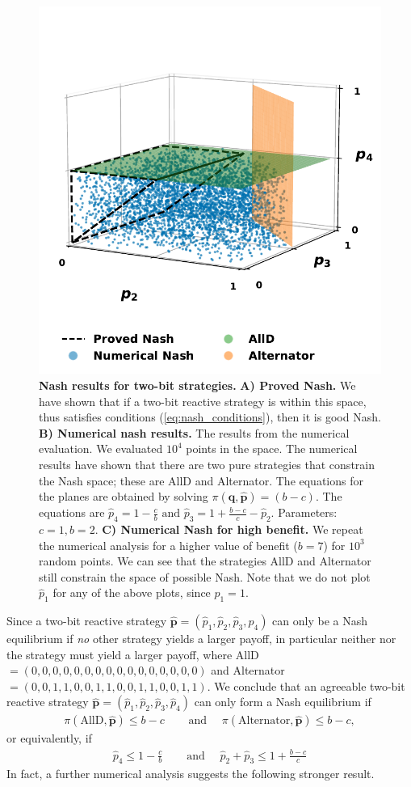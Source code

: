 \documentclass{article}
\theoremstyle{definition}
\begin{document}
\begin{figure}[!htbp]
    \centering
    \includegraphics[width=.35\textwidth]{static/for_akin.pdf}
    \caption{\textbf{Nash results for two-bit strategies.}
    \textbf{A) Proved Nash.} We have shown that if a two-bit reactive
    strategy is within this space, thus satisfies conditions
    (\ref{eq:nash_conditions}), then it is good Nash. \textbf{B) Numerical nash
    results.} The results from the numerical evaluation. We evaluated \(10 ^ 4\) points in
    the space. The numerical results have shown that there are two pure
    strategies that constrain the Nash space; these are AllD and Alternator.
    The equations for the planes are obtained by solving
    \(\pi(\mathbf{q}, \mathbf{\hat{p}}) = (b\!-\!c)\). The equations are
    \(\hat{p}_4 = 1 - \frac{c}{b} \text{ and }  \hat{p}_3 = 1 + \frac{b\!-\!c}{c} - \hat{p}_2\).
    Parameters: \(c=1, b=2\). \textbf{C) Numerical Nash for high benefit.} We repeat
    the numerical analysis for a higher value of benefit
    (\(b=7\)) for \(10 ^ 3\) random points. We can see that the strategies AllD
    and Alternator still constrain the space of possible Nash. Note that we do
    not plot \(\hat{p}_1\) for any of the above plots, since \(\hat{p}_1=1\).
    }\label{fig:two_bit_reactive_nash_results}
\end{figure}

Since a two-bit reactive strategy \(\mathbf{\hat{p}} = (\hat{p}_{1},
\hat{p}_{2}, \hat{p}_{3}, \hat{p}_{4})\) can only be a Nash equilibrium if {\it no} other strategy yields a larger payoff,  in particular neither  nor the  strategy must yield a larger payoff, where
AllD\(=(0, 0, 0, 0, 0, 0, 0, 0, 0, 0, 0, 0, 0, 0, 0, 0)\) and
Alternator\(=(0, 0, 1, 1, 0, 0, 1, 1, 0, 0, 1, 1, 0, 0, 1, 1)\). 
We conclude that an agreeable two-bit reactive strategy  \(\mathbf{\hat{p}} = (\hat{p}_{1}, \hat{p}_{2}, \hat{p}_{3}, \hat{p}_{4})\) can only form a Nash equilibrium if 
\begin{align*}
\pi(\text{AllD}, \mathbf{\hat{p}}) \leq b\!-\!c & \quad \text{ and } \quad \pi(\text{Alternator}, \mathbf{\hat{p}}) \leq b\!-\!c,
\end{align*}
or equivalently, if
\begin{align}\label{Eq:NashConditionDonationGame}
  \hat{p}_4 \leq 1 - \frac{c}{b} & \quad \text{ and } \quad  \hat{p}_2 + \hat{p}_3 \leq 1 + \frac{b\!-\!c}{c}
\end{align}
In fact, a further numerical analysis suggests the following stronger result. 
\end{document}
